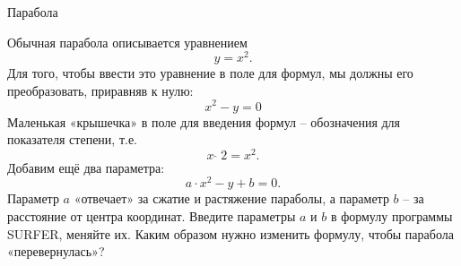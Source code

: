 \documentclass[ru]{./../../common/SurferDesc}%
\begin{document}
\footnotesize
%
\begin{surferPage}
  \begin{surferTitle}Парабола\end{surferTitle}
   \begin{surferText}
   
Обычная парабола описывается уравнением \[y=x^2.\]
Для того, чтобы ввести это уравнение в поле для формул, мы должны его преобразовать, приравняв к нулю:
\[x^2-y=0\]
Маленькая «крышечка» в поле для введения формул – обозначения для показателя степени, т.е.
\[ x  \,\hat{\ } \, 2 =x^2.\]
Добавим ещё два параметра:
\[a \cdot x^2-y+b=0.\]
Параметр $a$ «отвечает» за сжатие и растяжение параболы, а параметр $b$ – за расстояние от центра координат.
\newline
Введите параметры $a$ и $b$ в формулу программы SURFER, меняйте их. Каким образом нужно изменить формулу, чтобы парабола «перевернулась»?
\end{surferText}
\end{surferPage}
\end{document}
